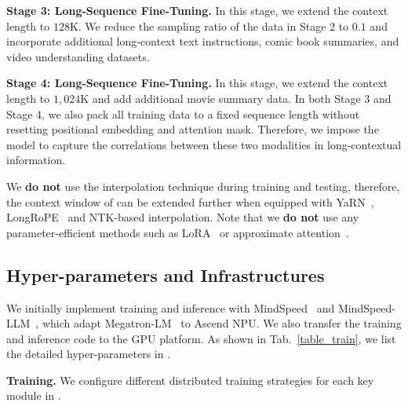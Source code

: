     \textbf{Stage 3: Long-Sequence Fine-Tuning.}
    In this stage, we extend the context length to $128$K.
    We reduce the sampling ratio of the data in Stage 2 to $0.1$ and incorporate additional long-context text instructions, comic book summaries, and video understanding datasets.

    \textbf{Stage 4: Long-Sequence Fine-Tuning.}
    In this stage, we extend the context length to $1,024$K and add additional movie summary data.
    In both Stage 3 and Stage 4, we also pack all training data to a fixed sequence length without resetting positional embedding and attention mask.
    Therefore, we impose the model to capture the correlations between these two modalities in long-contextual information.
    

%
We \textbf{do not} use the interpolation technique during training and testing, therefore, the context window of \OurMethod can be extended further when equipped with YaRN~\cite{YaRN}, LongRoPE~\cite{LongRoPE} and NTK-based interpolation.
%
Note that we \textbf{do not} use any parameter-efficient methods such as LoRA~\cite{LoRA} or approximate attention~\cite{LongLoRA}.
%














\subsection{Hyper-parameters and Infrastructures}

%
We initially implement training and inference with MindSpeed~\cite{MindSpeed} and MindSpeed-LLM~\cite{MindSpeed-LLM}, which adapt Megatron-LM~\cite{Megatron-LM} to Ascend NPU.
%
We also transfer the training and inference code to the GPU platform.
%
As shown in Tab.~\ref{table_train}, we list the detailed hyper-parameters in \OurMethod.
%



\textbf{Training.}
%
We configure different distributed training strategies for each key module in \OurMethod.
%

